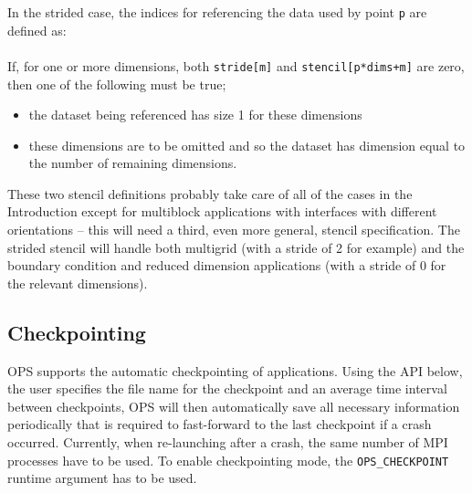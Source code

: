 \documentclass[11pt]{article}
\begin{document}
\vspace{0.2in}

\noindent In the strided case, the indices for referencing the data used by point {\tt p} are defined as:\\

\\

\noindent If, for one or more dimensions, both {\tt stride[m]} and {\tt stencil[p*dims+m]} are zero, then one of the
following must be true;
\begin{itemize}
\item
the dataset being referenced has size 1 for these dimensions
\item
these dimensions are to be omitted and so the dataset has 
dimension equal to the number of remaining dimensions.
\end{itemize}

\noindent These two stencil definitions probably take care of all of the cases in the Introduction except for 
multiblock applications with interfaces with different orientations -- this will need a third, even more general, 
stencil specification. \noindent The strided stencil will handle both multigrid (with a stride of 2 for example) and 
the boundary condition and reduced dimension applications (with a stride of 0 for the relevant dimensions).

\subsection{Checkpointing}
OPS supports the automatic checkpointing of applications. Using the API below, the user specifies the file name for the 
checkpoint and an average time interval between checkpoints, OPS will then automatically save all necessary information 
periodically that is required to fast-forward to the last checkpoint if a crash occurred. Currently, when re-launching 
after a crash, the same number of MPI processes have to be used. To enable checkpointing mode, the {\tt OPS\_CHECKPOINT} 
runtime argument has to be used.\\
\end{document}
